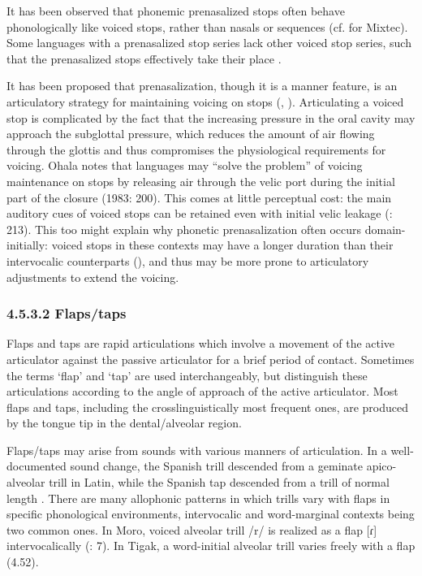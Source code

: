 \citep[54]{Epps2008}

\z


  It has been observed that phonemic prenasalized stops often behave phonologically like voiced stops, rather than nasals or sequences (cf. \citealt{IversonSalmons1996} for Mixtec). Some languages with a prenasalized stop series lack other voiced stop series, such that the prenasalized stops effectively take their place \citep[67-8]{Maddieson1984}.



  It has been proposed that prenasalization, though it is a manner feature, is an articulatory strategy for maintaining voicing on stops (\citealt{Ohala1983}, \citealt{HentonEtAl1992}). Articulating a voiced stop is complicated by the fact that the increasing pressure in the oral cavity may approach the subglottal pressure, which reduces the amount of air flowing through the glottis and thus compromises the physiological requirements for voicing. Ohala notes that languages may “solve the problem” of voicing maintenance on stops by releasing air through the velic port during the initial part of the closure (1983: 200). This comes at little perceptual cost: the main auditory cues of voiced stops can be retained even with initial velic leakage (\citealt{OhalaOhala1991}: 213). This too might explain why phonetic prenasalization often occurs domain-initially: voiced stops in these contexts may have a longer duration than their intervocalic counterparts (\citealt{FlegeBrown1982}), and thus may be more prone to articulatory adjustments to extend the voicing.


\subsubsection{\textbf{4.5.3.2} \textbf{Flaps/taps} }

  Flaps and taps are rapid articulations which involve a movement of the active articulator against the passive articulator for a brief period of contact. Sometimes the terms ‘flap’ and ‘tap’ are used interchangeably, but \citet{LadefogedMaddieson1996} distinguish these articulations according to the angle of approach of the active articulator. Most flaps and taps, including the crosslinguistically most frequent ones, are produced by the tongue tip in the dental/alveolar region.



  Flaps/taps may arise from sounds with various manners of articulation. In a well-documented sound change, the Spanish trill descended from a geminate apico-alveolar trill in Latin, while the Spanish tap descended from a trill of normal length \citep[17-18]{Hualde2004}. There are many allophonic patterns in which trills vary with flaps in specific phonological environments, intervocalic and word-marginal contexts being two common ones. In Moro, voiced alveolar trill /r/ is realized as a flap [ɾ] intervocalically (\citealt{BlackBlack1971}: 7). In Tigak, a word-initial alveolar trill varies freely with a flap (4.52).



